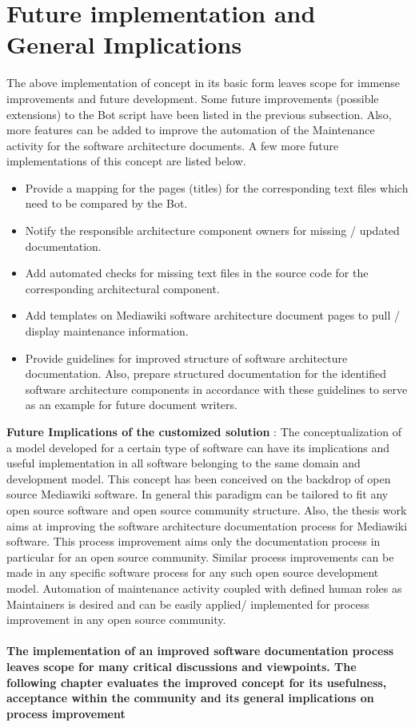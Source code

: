 \section{Future implementation and General Implications }
The above implementation of concept in its basic form leaves scope for immense improvements and future development. Some future improvements (possible extensions) to the Bot script have been listed in the previous subsection. Also, more features can be added to improve the automation of the Maintenance activity for the software architecture documents.
\newline A few more future implementations of this concept are listed below.
\begin{itemize}
\item Provide a mapping for the pages (titles) for the corresponding text files which need to be compared by the Bot.
\item Notify the responsible architecture component owners for missing / updated documentation.
\item Add automated checks for missing text files in the source code for the corresponding architectural component. 
\item Add templates on Mediawiki software architecture document pages to pull / display maintenance information.
\item Provide guidelines for improved structure of software architecture documentation.
Also, prepare structured documentation for the identified software architecture components in accordance with these guidelines to serve as an example for future document writers.
\end{itemize}

\textbf{Future Implications of the customized solution} : 
\newline The conceptualization of a model developed for a certain type of software can have its implications and useful implementation in all software belonging to the same domain and development model.
\newline This concept has been conceived on the backdrop of open source Mediawiki software. In general this paradigm can be tailored to fit any open source software and open source community structure. Also, the thesis work aims at improving the software architecture documentation process for Mediawiki software. 
\newline This process improvement aims only the documentation process in particular for an open source community. Similar process improvements can be made in any specific software process for any such open source development model. Automation of maintenance activity coupled with defined human roles as Maintainers is desired and can be easily applied/ implemented for process improvement in any open source community.

\paragraph{The implementation of an improved software documentation process leaves scope for many critical discussions and viewpoints. The following chapter evaluates the improved concept for its usefulness, acceptance within the community and its general implications on process improvement}